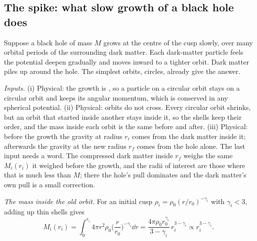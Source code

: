 \subsection{The spike: what slow growth of a black hole does}

Suppose a black hole of mass $M$ grows at the centre of the cusp slowly, over many orbital periods of the surrounding dark matter. Each dark-matter particle feels the potential deepen gradually and moves inward to a tighter orbit. Dark matter piles up around the hole. The simplest orbits, circles, already give the answer.

\emph{Inputs.} (i) Physical: the growth is  , so a particle on a circular orbit stays on a circular orbit and keeps its angular momentum, which is conserved in any spherical potential. (ii) Physical: orbits do not cross. Every circular orbit shrinks, but an orbit that started inside another stays inside it, so the shells keep their order, and the mass inside each orbit is the same before and after. (iii) Physical: before the growth the gravity at radius $r_i$ comes from the dark matter inside it; afterwards the gravity at the new radius $r_f$ comes from the hole alone. The last input needs a word. The compressed dark matter inside $r_f$ weighs the same $M_i(r_i)$ it weighed before the growth, and the radii of interest are those where that is much less than $M$; there the hole's pull dominates and the dark matter's own pull is a small correction.

\emph{The mass inside the old orbit.} For an initial cusp $\rho_i=\rho_0(r/r_0)^{-\gamma_i}$ with $\gamma_i<3$, adding up thin shells gives
\[
  M_i(r_i)=\int_0^{r_i}4\pi r^2\rho_0\Big(\frac{r}{r_0}\Big)^{-\gamma_i}\dd r=\frac{4\pi\rho_0r_0^{\gamma_i}}{3-\gamma_i}\,r_i^{3-\gamma_i}\propto r_i^{3-\gamma_i}.
\]

